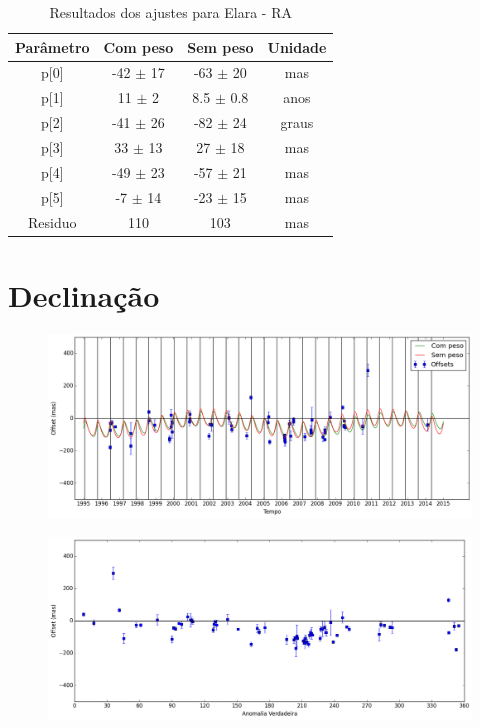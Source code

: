 \documentclass[11pt,a4paper]{report}
\begin{document}
\begin{table}[h!]
\caption{\label{Tab: Elara-RA} Resultados dos ajustes para Elara - RA}
\begin{centering}
\begin{tabular}{cccc}
\hline
\hline
Parâmetro & Com peso & Sem peso & Unidade\tabularnewline
\hline
p[0] & -42 $\pm$ 17 & -63 $\pm$ 20 & mas\\
p[1] & 11 $\pm$ 2 & 8.5 $\pm$ 0.8 & anos\\
p[2] & -41 $\pm$ 26 & -82 $\pm$ 24 & graus\\
p[3] & 33 $\pm$ 13 & 27 $\pm$ 18 & mas\\
p[4] & -49 $\pm$ 23 & -57 $\pm$ 21 & mas\\
p[5] & -7 $\pm$ 14 & -23 $\pm$ 15 & mas\\
Residuo & 110 & 103 & mas\\
\hline 
\end{tabular} 
\par\end{centering}
\end{table}

\section*{Declinação}

\begin{figure}[h]
\includegraphics[scale=0.45]{Elara/DEC.png} 
\end{figure}

\begin{figure}[h]
\includegraphics[scale=0.45]{Elara/DEC_anom.png}  
\end{figure}
\end{document}
